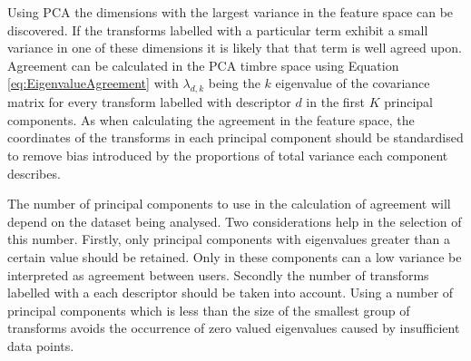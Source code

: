 			Using PCA the dimensions with the largest variance in the feature space can be discovered. If the
			transforms labelled with a particular term exhibit a small variance in one of these dimensions it
			is likely that that term is well agreed upon. Agreement can be calculated in the PCA timbre space
			using Equation \ref{eq:EigenvalueAgreement} with $\lambda_{d,k}$ being the $k$ eigenvalue
			of the covariance matrix for every transform labelled with descriptor $d$ in the first $K$
			principal components. As when calculating the agreement in the feature space, the coordinates of
			the transforms in each principal component should be standardised to remove bias introduced by the
			proportions of total variance each component describes.

			The number of principal components to use in the calculation of agreement will depend on the
			dataset being analysed. Two considerations help in the selection of this number. Firstly, only
			principal components with eigenvalues greater than a certain value should be retained. Only in
			these components can a low variance be interpreted as agreement between users. Secondly the number
			of transforms labelled with a each descriptor should be taken into account. Using a number of
			principal components which is less than the size of the smallest group of transforms avoids the
			occurrence of zero valued eigenvalues caused by insufficient data points.
